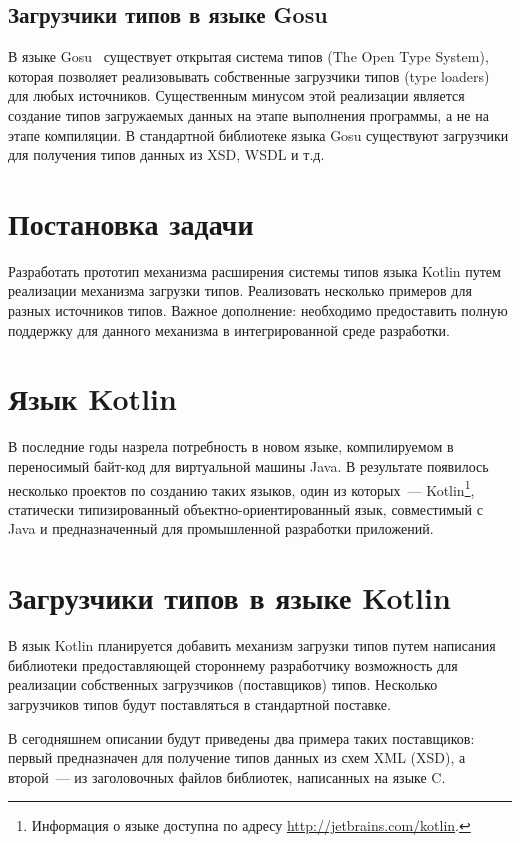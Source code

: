 \documentclass{article}
\begin{document}
\subsection{Загрузчики типов в языке Gosu}
В языке Gosu~\cite{gosuguide} существует открытая система типов (The Open Type System), которая позволяет реализовывать собственные загрузчики типов (type loaders) для любых источников.
Существенным минусом этой реализации является создание типов загружаемых данных на этапе выполнения программы, а не на этапе компиляции.
В стандартной библиотеке языка Gosu существуют загрузчики для получения типов данных из XSD, WSDL и т.д.

\section{Постановка задачи}
Разработать прототип механизма расширения системы типов языка Kotlin путем реализации механизма загрузки типов. Реализовать несколько примеров для разных источников типов.
Важное дополнение: необходимо предоставить полную поддержку для данного механизма в интегрированной среде разработки.

\section{Язык Kotlin}
В последние годы назрела потребность в новом языке, компилируемом в переносимый байт-код для виртуальной машины Java.
В результате появилось несколько проектов по созданию таких языков, один из которых~--- Kotlin\footnote{Информация о языке доступна по адресу \url{http://jetbrains.com/kotlin}.},
статически типизированный объектно-ориентированный язык, совместимый с Java и предназначенный для промышленной разработки приложений.

\section{Загрузчики типов в языке Kotlin}
В язык Kotlin планируется добавить механизм загрузки типов путем написания библиотеки предоставляющей стороннему разработчику возможность для реализации собственных загрузчиков (поставщиков) типов. Несколько загрузчиков типов будут поставляться в стандартной поставке.

В сегодняшнем описании будут приведены два примера таких поставщиков: первый предназначен для получение типов данных из схем XML (XSD), а второй~--- из заголовочных файлов библиотек, написанных на языке C.
\end{document}
